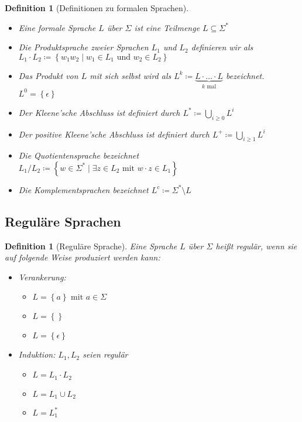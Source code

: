\documentclass[11pt]{scrartcl}
\newcommand{\set}[1]{\left\lbrace #1\right\rbrace}
\theoremstyle{break}
\newtheorem{defi}[satz]{Definition}
\begin{document}
    \begin{defi}[Definitionen zu formalen Sprachen]
        \begin{itemize}
            \item Eine formale Sprache $L$ über $\Sigma$ ist eine Teilmenge $L\subseteq\Sigma^*$
            \item Die Produktsprache zweier Sprachen $L_1$ und $L_2$ definieren wir als\\ $L_1\cdot L_2\coloneqq\set{w_{1}w_{2}\mid w_{1}\in L_{1}\text{ und } w_{2}\in L_2}$
            \item Das Produkt von $L$ mit sich selbst wird als $L^k\coloneqq \underbrace{L\cdot\dots\cdot L}_{k\text{ mal}}$ bezeichnet. $L^0 = \set{\epsilon}$
            \item Der Kleene'sche Abschluss ist definiert durch $L^*\coloneqq \bigcup\limits_{i\geq 0} L^i$
            \item Der positive Kleene'sche Abschluss ist definiert durch $L^+\coloneqq \bigcup\limits_{i\geq 1} L^i$
            \item Die Quotientensprache bezeichnet $L_1/L_2\coloneqq\set{w\in \Sigma^*\mid\exists z\in L_2\text{ mit } w\cdot z\in L_1}$
            \item Die Komplementsprachen bezeichnet $L^c\coloneqq\Sigma^*\setminus L$
        \end{itemize}
    \end{defi}


    \subsection{Reguläre Sprachen}
	\label{subsec:reguläre-sprachen}

    \begin{defi}[Reguläre Sprache]
        Eine Sprache $L$ über $\Sigma$ heißt regulär, wenn sie auf folgende Weise produziert werden kann:
        \begin{itemize}
            \item Verankerung:
            \begin{itemize}
                \item $L=\set{a}\text{ mit } a\in\Sigma$
                \item $L=\set{}$
                \item $L=\set{\epsilon}$
            \end{itemize}
            \item Induktion: $L_1,L_2$ seien regulär
            \begin{itemize}
                \item $L=L_1\cdot L_2$
                \item $L=L_1\cup L_2$
                \item $L=L_1^*$
            \end{itemize}
        \end{itemize}
    \end{defi}
\end{document}
